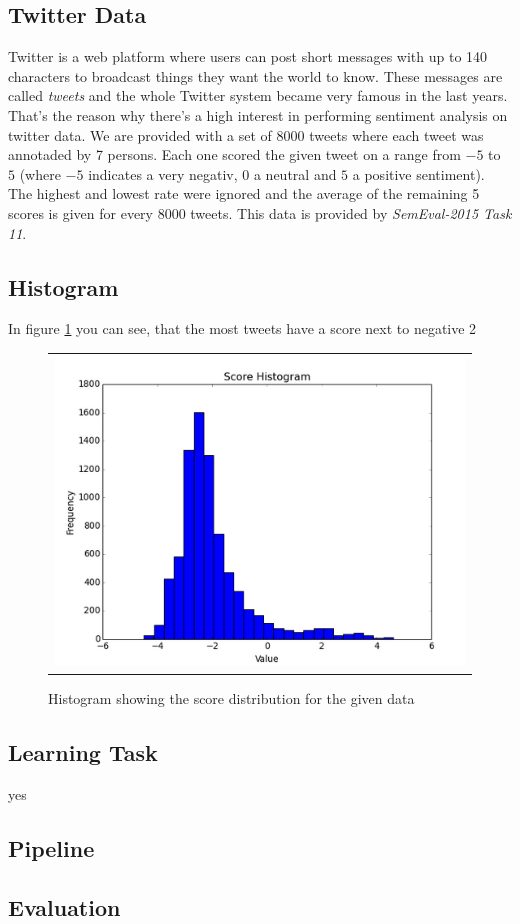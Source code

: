 \subsection{Twitter Data} %
\label{sub:twitter_data}
Twitter is a web platform where users can post short messages with up to 140 characters to broadcast things they want the world to know. These messages are called \textit{tweets} and the whole Twitter system became very famous in the last years. That's the reason why there's a high interest in performing sentiment analysis on twitter data. We are provided with a set of 8000 tweets where each tweet was annotaded by 7 persons. Each one scored the given tweet on a range from $-5$ to $5$ (where $-5$ indicates a very negativ, $0$ a neutral and $5$ a positive sentiment). The highest and lowest rate were ignored and the average of the remaining 5 scores is given for every 8000 tweets. This data is provided by \textit{SemEval-2015 Task 11}.

\subsection{Histogram} %
\label{sub:histogram}
In figure \ref{fig:hist_data} you can see, that the most tweets have a score next to negative 2

\begin{figure}[ht]
\centering 
  \begin{tabular}{@{}l@{}}
    \includegraphics[width=0.6\linewidth]{img/data_hist.png}
  \end{tabular} 
  \caption{Histogram showing the score distribution for the given data} 
  \label{fig:hist_data} 
\end{figure}


\subsection{Learning Task} %
\label{sub:learning_task}
yes

\subsection{Pipeline} %
\label{sub:pipeline}


\subsection{Evaluation} %
\label{sub:evaluation}


